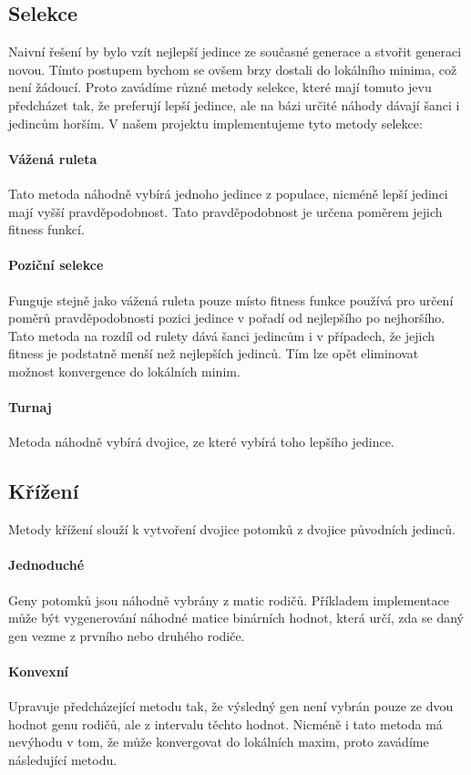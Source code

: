 \documentclass[a4paper,11pt,titlepage]{scrartcl}
\begin{document}
\subsection{Selekce}
Naivní řešení by bylo vzít nejlepší jedince ze současné generace a stvořit generaci novou. Tímto postupem bychom se ovšem brzy dostali do lokálního minima, což není žádoucí. Proto zavádíme různé metody selekce, které mají tomuto jevu předcházet tak, že preferují lepší jedince, ale na bázi určité náhody dávají šanci i jedincům horším. V našem projektu implementujeme tyto metody selekce:

\paragraph{Vážená ruleta}
Tato metoda náhodně vybírá jednoho jedince z populace, nicméně lepší jedinci mají vyšší pravděpodobnost. Tato pravděpodobnost je určena poměrem jejich fitness funkcí.

\paragraph{Poziční selekce}
Funguje stejně jako vážená ruleta pouze místo fitness funkce používá pro určení poměrů pravděpodobnosti pozici jedince v pořadí od nejlepšího po nejhoršího. Tato metoda na rozdíl od rulety dává šanci jedincům i v případech, že jejich fitness je podstatně menší než nejlepších jedinců. Tím lze opět eliminovat možnost konvergence do lokálních minim.

\paragraph{Turnaj}
Metoda náhodně vybírá dvojice, ze které vybírá toho lepšího jedince.

\subsection{Křížení}
Metody křížení slouží k vytvoření dvojice potomků z dvojice původních jedinců.

\paragraph{Jednoduché}
Geny potomků jsou náhodně vybrány z matic rodičů. Příkladem implementace může být vygenerování náhodné matice binárních hodnot, která určí, zda se daný gen vezme z prvního nebo druhého rodiče.

\paragraph{Konvexní}
Upravuje předcházející metodu tak, že výsledný gen není vybrán pouze ze dvou hodnot genu rodičů, ale z intervalu těchto hodnot. Nicméně i tato metoda má nevýhodu v tom, že může konvergovat do lokálních maxim, proto zavádíme následující metodu.
\end{document}
